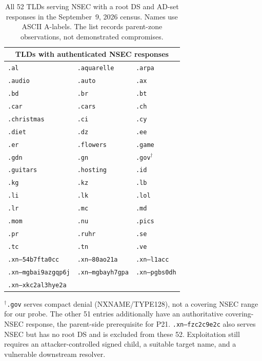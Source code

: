\begin{table}[t]
\centering
\caption{All 52 TLDs serving NSEC with a root DS and AD-set responses in the September~9, 2026 census. Names use ASCII A-labels. The list records parent-zone observations, not demonstrated compromises.}
\label{tab:tld_nsec_census}
\small
\begin{tabular*}{\columnwidth}{@{\extracolsep{\fill}}lll@{}}
\toprule
\multicolumn{3}{c}{\textbf{TLDs with authenticated NSEC responses}} \\
\midrule
\texttt{.al} & \texttt{.aquarelle} & \texttt{.arpa} \\
\texttt{.audio} & \texttt{.auto} & \texttt{.ax} \\
\texttt{.bd} & \texttt{.br} & \texttt{.bt} \\
\texttt{.car} & \texttt{.cars} & \texttt{.ch} \\
\texttt{.christmas} & \texttt{.ci} & \texttt{.cy} \\
\texttt{.diet} & \texttt{.dz} & \texttt{.ee} \\
\texttt{.er} & \texttt{.flowers} & \texttt{.game} \\
\texttt{.gdn} & \texttt{.gn} & \texttt{.gov}$^\dagger$ \\
\texttt{.guitars} & \texttt{.hosting} & \texttt{.id} \\
\texttt{.kg} & \texttt{.kz} & \texttt{.lb} \\
\texttt{.li} & \texttt{.lk} & \texttt{.lol} \\
\texttt{.lr} & \texttt{.mc} & \texttt{.md} \\
\texttt{.mom} & \texttt{.nu} & \texttt{.pics} \\
\texttt{.pr} & \texttt{.ruhr} & \texttt{.se} \\
\texttt{.tc} & \texttt{.tn} & \texttt{.ve} \\
\texttt{.xn--54b7fta0cc} & \texttt{.xn--80ao21a} & \texttt{.xn--l1acc} \\
\texttt{.xn--mgbai9azgqp6j} & \texttt{.xn--mgbayh7gpa} & \texttt{.xn--pgbs0dh} \\
\texttt{.xn--xkc2al3hye2a} &  &  \\
\bottomrule
\end{tabular*}
\begin{minipage}{\columnwidth}
\footnotesize
$^\dagger$\texttt{.gov} serves compact denial (NXNAME/TYPE128), not a covering NSEC range for our probe. The other 51 entries additionally have an authoritative covering-NSEC response, the parent-side prerequisite for P21. \texttt{.xn--fzc2c9e2c} also serves NSEC but has no root DS and is excluded from these 52. Exploitation still requires an attacker-controlled signed child, a suitable target name, and a vulnerable downstream resolver.
\end{minipage}
\end{table}
